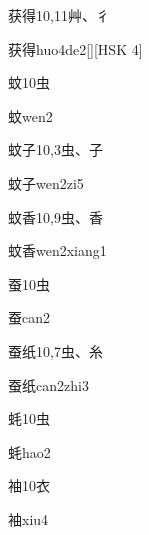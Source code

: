 \begin{Entry}{获得}{10,11}{⾋、⼻}
  \begin{Phonetics}{获得}{huo4de2}[][HSK 4]
  \end{Phonetics}
\end{Entry}

\begin{Entry}{蚊}{10}{⾍}
  \begin{Phonetics}{蚊}{wen2}
  \end{Phonetics}
\end{Entry}

\begin{Entry}{蚊子}{10,3}{⾍、⼦}
  \begin{Phonetics}{蚊子}{wen2zi5}
  \end{Phonetics}
\end{Entry}

\begin{Entry}{蚊香}{10,9}{⾍、⾹}
  \begin{Phonetics}{蚊香}{wen2xiang1}
  \end{Phonetics}
\end{Entry}

\begin{Entry}{蚕}{10}{⾍}
  \begin{Phonetics}{蚕}{can2}
  \end{Phonetics}
\end{Entry}

\begin{Entry}{蚕纸}{10,7}{⾍、⽷}
  \begin{Phonetics}{蚕纸}{can2zhi3}
  \end{Phonetics}
\end{Entry}

\begin{Entry}{蚝}{10}{⾍}
  \begin{Phonetics}{蚝}{hao2}
  \end{Phonetics}
\end{Entry}

\begin{Entry}{袖}{10}{⾐}
  \begin{Phonetics}{袖}{xiu4}
  \end{Phonetics}
\end{Entry}

